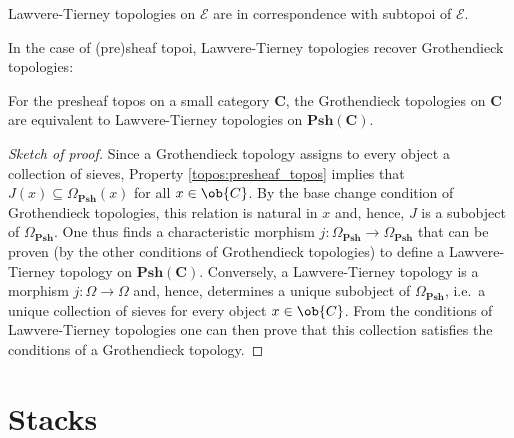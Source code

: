 
    \begin{property}
        Lawvere-Tierney topologies on $\mathcal{E}$ are in correspondence with subtopoi of $\mathcal{E}$.
    \end{property}
    In the case of (pre)sheaf topoi, Lawvere-Tierney topologies recover Grothendieck topologies:
    \begin{result}
        For the presheaf topos on a small category $\mathbf{C}$, the Grothendieck topologies on $\mathbf{C}$ are equivalent to Lawvere-Tierney topologies on $\mathbf{Psh(C)}$.
        \begin{mdframed}[roundcorner=10pt, linecolor=blue, linewidth=1pt]
            \begin{proof}[Sketch of proof]
                Since a Grothendieck topology assigns to every object a collection of sieves, Property \ref{topos:presheaf_topos} implies that $J(x)\subseteq\Omega_\mathbf{Psh}(x)$ for all $x\in\ob{C}$. By the base change condition of Grothendieck topologies, this relation is natural in $x$ and, hence, $J$ is a subobject of $\Omega_\mathbf{Psh}$. One thus finds a characteristic morphism $j:\Omega_\mathbf{Psh}\rightarrow\Omega_\mathbf{Psh}$ that can be proven (by the other conditions of Grothendieck topologies) to define a Lawvere-Tierney topology on $\mathbf{Psh(C)}$. Conversely, a Lawvere-Tierney topology is a morphism $j:\Omega\rightarrow\Omega$ and, hence, determines a unique subobject of $\Omega_\mathbf{Psh}$, i.e.~a unique collection of sieves for every object $x\in\ob{C}$. From the conditions of Lawvere-Tierney topologies one can then prove that this collection satisfies the conditions of a Grothendieck topology.
            \end{proof}
        \end{mdframed}
    \end{result}

\section{Stacks}
